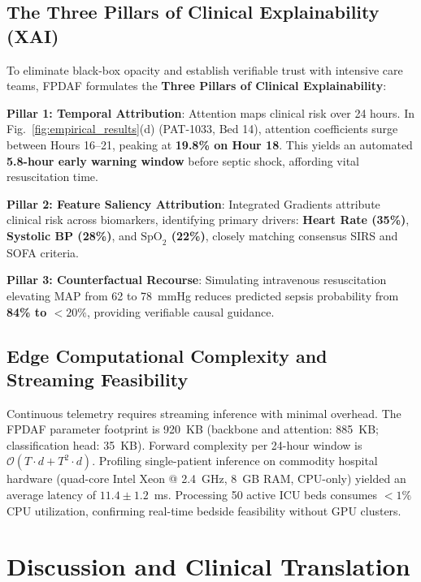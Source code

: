\documentclass{llncs}
\begin{document}
\subsection{The Three Pillars of Clinical Explainability (XAI)}
To eliminate black-box opacity and establish verifiable trust with intensive care teams, FPDAF formulates the \textbf{Three Pillars of Clinical Explainability}:

\noindent\textbf{Pillar 1: Temporal Attribution}: Attention maps clinical risk over 24 hours. In Fig.~\ref{fig:empirical_results}(d) (PAT-1033, Bed 14), attention coefficients surge between Hours 16--21, peaking at \textbf{19.8\% on Hour 18}. This yields an automated \textbf{5.8-hour early warning window} before septic shock, affording vital resuscitation time.

\noindent\textbf{Pillar 2: Feature Saliency Attribution}: Integrated Gradients attribute clinical risk across biomarkers, identifying primary drivers: \textbf{Heart Rate (35\%)}, \textbf{Systolic BP (28\%)}, and \textbf{$\text{SpO}_2$ (22\%)}, closely matching consensus SIRS and SOFA criteria.

\noindent\textbf{Pillar 3: Counterfactual Recourse}: Simulating intravenous resuscitation elevating MAP from 62 to 78~mmHg reduces predicted sepsis probability from \textbf{84\% to $<20\%$}, providing verifiable causal guidance.

\subsection{Edge Computational Complexity and Streaming Feasibility}
Continuous telemetry requires streaming inference with minimal overhead. The FPDAF parameter footprint is 920~KB (backbone and attention: 885~KB; classification head: 35~KB). Forward complexity per 24-hour window is $\mathcal{O}(T \cdot d + T^2 \cdot d)$. Profiling single-patient inference on commodity hospital hardware (quad-core Intel Xeon @ 2.4~GHz, 8~GB RAM, CPU-only) yielded an average latency of $11.4 \pm 1.2$~ms. Processing 50 active ICU beds consumes $<1\%$ CPU utilization, confirming real-time bedside feasibility without GPU clusters.

\section{Discussion and Clinical Translation}
\label{sec:discussion}
\end{document}
